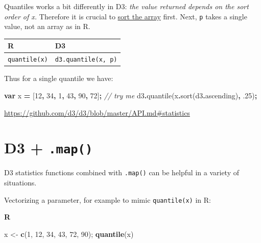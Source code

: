 \documentclass[
  openany]{book}
\newenvironment{Shaded}{\begin{snugshade}}{\end{snugshade}}
\newcommand{\AttributeTok}[1]{\textcolor[rgb]{0.77,0.63,0.00}{#1}}
\newcommand{\CommentTok}[1]{\textcolor[rgb]{0.56,0.35,0.01}{\textit{#1}}}
\newcommand{\DecValTok}[1]{\textcolor[rgb]{0.00,0.00,0.81}{#1}}
\newcommand{\FloatTok}[1]{\textcolor[rgb]{0.00,0.00,0.81}{#1}}
\newcommand{\FunctionTok}[1]{\textcolor[rgb]{0.00,0.00,0.00}{#1}}
\newcommand{\KeywordTok}[1]{\textcolor[rgb]{0.13,0.29,0.53}{\textbf{#1}}}
\newcommand{\NormalTok}[1]{#1}
\newcommand{\OperatorTok}[1]{\textcolor[rgb]{0.81,0.36,0.00}{\textbf{#1}}}
\newcommand{\StringTok}[1]{\textcolor[rgb]{0.31,0.60,0.02}{#1}}
\begin{document}
Quantiles works a bit differently in D3: \emph{the value returned depends on the sort order of x.} Therefore it is crucial to \href{just-enough-js.html\#sorting}{sort the array} first. Next, \texttt{p} takes a single value, not an array as in R.

\begin{longtable}[]{@{}ll@{}}
\toprule
R & D3\tabularnewline
\midrule
\endhead
\texttt{quantile(x)} & \texttt{d3.quantile(x,\ p)}\tabularnewline
\bottomrule
\end{longtable}

Thus for a single quantile we have:

\begin{Shaded}
\begin{Highlighting}[]
\KeywordTok{var}\NormalTok{ x }\OperatorTok{=}\NormalTok{ [}\DecValTok{12}\OperatorTok{,} \DecValTok{34}\OperatorTok{,} \DecValTok{1}\OperatorTok{,} \DecValTok{43}\OperatorTok{,} \DecValTok{90}\OperatorTok{,} \DecValTok{72}\NormalTok{]}\OperatorTok{;}      \CommentTok{// try me}
\NormalTok{d3}\OperatorTok{.}\FunctionTok{quantile}\NormalTok{(x}\OperatorTok{.}\FunctionTok{sort}\NormalTok{(d3}\OperatorTok{.}\AttributeTok{ascending}\NormalTok{)}\OperatorTok{,} \FloatTok{.25}\NormalTok{)}\OperatorTok{;}
\end{Highlighting}
\end{Shaded}

\url{https://github.com/d3/d3/blob/master/API.md\#statistics}

\hypertarget{d3-.map}{%
\section{\texorpdfstring{D3 + \texttt{.map()}}{D3 + .map()}}\label{d3-.map}}

D3 statistics functions combined with \texttt{.map()} can be helpful in a variety of situations.

Vectorizing a parameter, for example to mimic \texttt{quantile(x)} in R:

\textbf{R}

\begin{Shaded}
\begin{Highlighting}[]
\NormalTok{x \textless{}{-}}\StringTok{ }\KeywordTok{c}\NormalTok{(}\DecValTok{1}\NormalTok{, }\DecValTok{12}\NormalTok{, }\DecValTok{34}\NormalTok{, }\DecValTok{43}\NormalTok{, }\DecValTok{72}\NormalTok{, }\DecValTok{90}\NormalTok{);  }
\KeywordTok{quantile}\NormalTok{(x)}
\end{Highlighting}
\end{Shaded}
\end{document}
